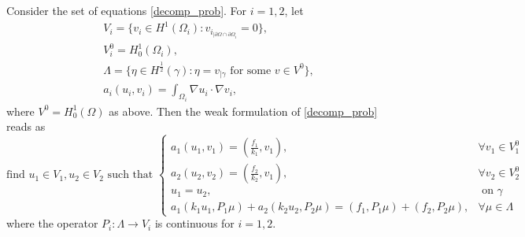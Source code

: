 \begin{proposition}
    Consider the set of equations \eqref{decomp_prob}. For \(i=1, 2\), let
    \begin{align*}
        &V_i = \{v_i \in H^1(\Omega_i): v_{i_{|\partial \Omega \cap \partial {\Omega_i}}}=0\},\\
        &V_i^0 = H^1_0(\Omega_i),\\
        &\Lambda = \{\eta \in H^\frac{1}{2}(\gamma): \eta = v_{|\gamma} \text{ for some } v \in V^0\}, \\
        &a_i (u_i, v_i) = \int_{\Omega_i} \nabla u_i \cdot \nabla v_i,
    \end{align*}
    where \(V^0 = H^1_0(\Omega)\) as above.
    Then the weak formulation of \eqref{decomp_prob} reads as
    \begin{equation}\label{weak_decomp}
        \text{find } u_1\in V_1, u_2 \in V_2 \text{ such that }
        \begin{cases}
            a_1(u_1, v_1) = (\frac{f_1}{k_1}, v_1), & \forall v_1 \in V_1^0\\
            a_2(u_2, v_2) = (\frac{f_2}{k_2}, v_1), & \forall v_2 \in V_2^0\\
            u_1 = u_2, & \text{ on } \gamma\\
            a_1(k_1 u_1, P_1 \mu) + a_2(k_2 u_2, P_2 \mu) = (f_1, P_1 \mu) + (f_2, P_2 \mu), & \forall \mu \in \Lambda
        \end{cases}
    \end{equation}
    where the operator \(P_i: \Lambda \rightarrow V_i\) is continuous for \(i=1, 2\).
\end{proposition}


